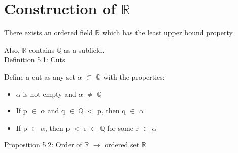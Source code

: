 \newpage
\section[Day 3: Existence of $\mathbb{R}$]{Construction of $\mathbb{R}$}

	\begin{adjustbox}{minipage=14cm, right, vspace=0.1cm 0cm}
		There exists an ordered field $\mathbb{R}$ which has the
		least upper bound property.

		Also, $\mathbb{R}$ contains $\mathbb{Q}$ as a subfield. \\
	\end{adjustbox}
	
{ \color{blue} Definition 5.1: Cuts }

	\begin{adjustbox}{minipage=14cm, right, vspace=0.1cm 0cm}
		Define a cut as any set $\alpha$ $\subset$ $\mathbb{Q}$ with the properties:
	\end{adjustbox}

	\begin{itemize}[leftmargin=2cm, itemsep=0.1cm]
		\item $\alpha$ is not empty and $\alpha$ $\not =$ $\mathbb{Q}$
		
		\item If p $\in$ $\alpha$ and q $\in$ $\mathbb{Q}$ $<$ p,
			then q $\in$ $\alpha$
		
			\item If p $\in$ $\alpha$, then p $<$ r $\in$ $\mathbb{Q}$ for
			some r $\in$ $\alpha$ \\
	\end{itemize}

{ \color{blue} Proposition 5.2: Order of $\mathbb{R}$ $\rightarrow$ ordered set $\mathbb{R}$ }

